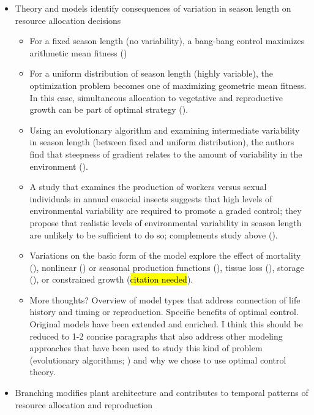 \documentclass[12pt, oneside,titlepage]{article}   	%
\begin{document}
\begin{itemize}
\item Theory and models identify consequences of variation in season length on resource allocation decisions

\begin{itemize}
\item For a fixed season length (no variability), a bang-bang control maximizes arithmetic mean fitness (\cite{cohen1971})
\item For a uniform distribution of season length (highly variable), the optimization problem becomes one of maximizing geometric mean fitness. In this case, simultaneous allocation to vegetative and reproductive growth can be part of optimal strategy (\cite{king1982a}). 
\item Using an evolutionary algorithm and examining intermediate variability in season length (between fixed and uniform distribution), the authors find that steepness of gradient relates to the amount of variability in the environment (\cite{wong2005}). 
\item A study that examines the production of workers versus sexual individuals in annual eusocial insects suggests that high levels of environmental variability are required to promote a graded control; they propose that realistic levels of environmental variability in season length are unlikely to be sufficient to do so; complements study above (\cite{mitesser2007}).
\item Variations on the basic form of the model explore the effect of mortality (\cite{cohen1976}), nonlinear (\cite{vincent1980}) or seasonal production functions (\cite{schaffer1982,fox1992}), tissue loss (\cite{king1982}), storage (\cite{chiariello1984}), or constrained growth (\hl{citation needed}).
\item More thoughts? Overview of model types that address connection of life history and timing or reproduction. Specific benefits of optimal control. Original models have been extended and enriched. I think this should be reduced to 1-2 concise paragraphs that also address other modeling approaches that have been used to study this kind of problem (evolutionary algorithms; \cite{wong2005}) and why we chose to use optimal control theory.
\end{itemize}

\item Branching modifies plant architecture and contributes to temporal patterns of resource allocation and reproduction


\end{itemize}
\end{document}
